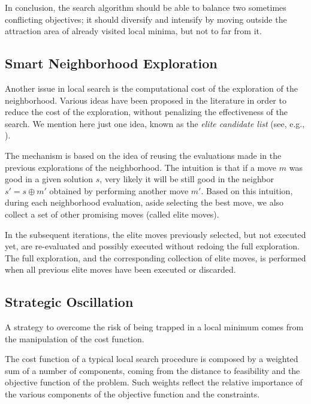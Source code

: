 In conclusion, the search algorithm should be able to balance two
sometimes conflicting objectives; it should diversify and intensify by
moving outside the attraction area of already visited local minima,
but not to far from it.  


\subsection{Smart Neighborhood Exploration}

Another issue in local search is the computational cost of the
exploration of the neighborhood.  Various ideas have been proposed in
the literature in order to reduce the cost of the exploration, without
penalizing the effectiveness of the search. We mention here just one
idea, known as the \emph{elite candidate list} (see, e.g., \cite[Section 3.2]{GlLa97}).

The mechanism is based on the idea of reusing the evaluations made in the
previous explorations of the neighborhood. The intuition is that if a move $m$
was good in a given solution $s$, very likely it will be still good in the neighbor 
$s' = s \oplus m'$ obtained by performing another move
$m'$.  Based on this intuition, during each neighborhood evaluation, aside selecting the best move, 
we also collect a set of other promising moves (called elite moves). 

In the subsequent iterations, the elite moves previously selected, but
not executed yet, are re-evaluated and possibly executed without
redoing the full exploration. The full exploration, and the
corresponding collection of elite moves, is performed when all
previous elite moves have been executed or discarded.



\subsection{Strategic Oscillation}
\label{sec:strategic-oscillation}

A strategy to overcome the risk of being trapped in a local minimum comes from the manipulation of the cost function.

The cost function of a typical local search procedure is composed by a weighted sum of a
number of components, coming from the distance to feasibility and the objective function
of the problem.  Such weights reflect the relative importance of the
various components of the objective function and the constraints.  

